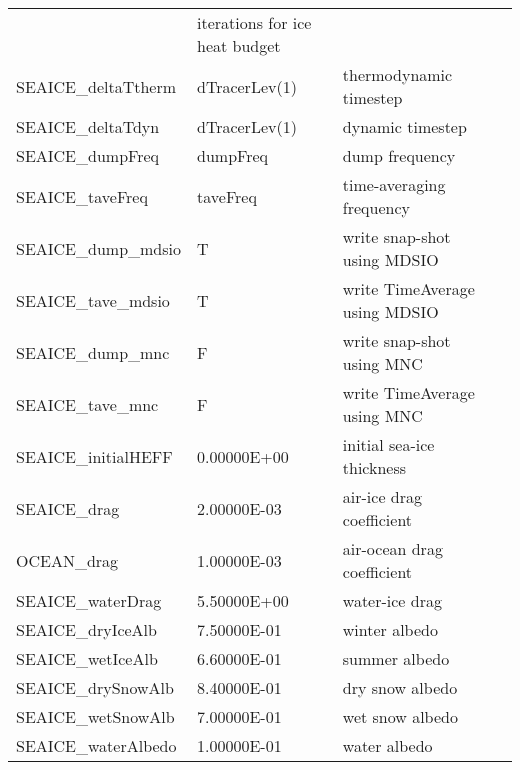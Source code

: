 \begin{table}[!ht]
{\begin{tabular}{|llp{5cm}c|}
    &   iterations for ice heat budget 
    &  %
    \\
   SEAICE\_deltaTtherm  &                   dTracerLev(1)
    &   thermodynamic timestep 
    &  %
    \\
   SEAICE\_deltaTdyn    &                   dTracerLev(1)
    &   dynamic timestep 
    &  %
    \\
   SEAICE\_dumpFreq     &                   dumpFreq
    &   dump frequency 
    &  %
    \\
   SEAICE\_taveFreq     &                   taveFreq
    &   time-averaging frequency 
    &  %
    \\
   SEAICE\_dump\_mdsio   &                     T
    &   write snap-shot   using MDSIO 
    &  %
    \\
   SEAICE\_tave\_mdsio   &                     T
    &   write TimeAverage using MDSIO 
    &  %
    \\
   SEAICE\_dump\_mnc     &                     F
    &   write snap-shot   using MNC 
    &  %
    \\
   SEAICE\_tave\_mnc     &                     F
    &   write TimeAverage using MNC 
    &  %
    \\
   SEAICE\_initialHEFF  &                   0.00000E+00
    &   initial sea-ice thickness 
    &  %
    \\
   SEAICE\_drag         &                   2.00000E-03
    &   air-ice drag coefficient 
    &  %
    \\
   OCEAN\_drag          &                   1.00000E-03
    &   air-ocean drag coefficient 
    &  %
    \\
   SEAICE\_waterDrag    &                   5.50000E+00
    &   water-ice drag 
    &  %
    \\
   SEAICE\_dryIceAlb    &                   7.50000E-01
    &   winter albedo 
    &  %
    \\
   SEAICE\_wetIceAlb    &                   6.60000E-01
    &   summer albedo 
    &  %
    \\
   SEAICE\_drySnowAlb   &                   8.40000E-01
    &   dry snow albedo 
    &  %
    \\
   SEAICE\_wetSnowAlb   &                   7.00000E-01
    &   wet snow albedo 
    &  %
    \\
   SEAICE\_waterAlbedo  &                   1.00000E-01
    &   water albedo 
    &  %

\end{tabular}}
\end{table}
